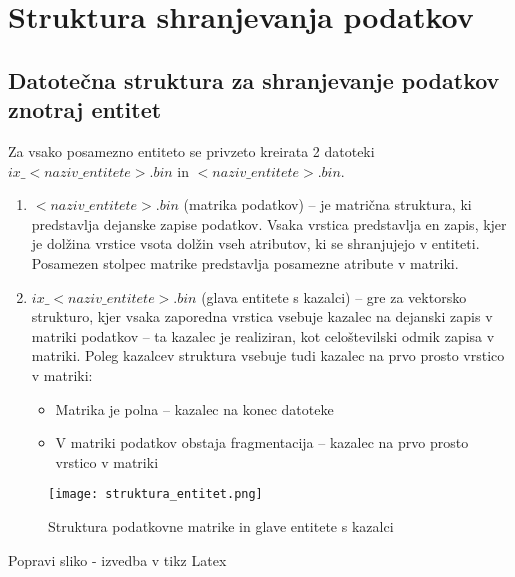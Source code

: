 \documentclass[a4paper,12pt,openright]{book}
\begin{document}
    \section{Struktura shranjevanja podatkov}
        \subsection{Datotečna struktura za shranjevanje podatkov znotraj entitet}
        Za vsako posamezno entiteto se privzeto kreirata 2 datoteki $ix\_<naziv\_entitete>.bin$ in $<naziv\_entitete>.bin$.
        \begin{enumerate}
            \item $<naziv\_entitete>.bin$ (matrika podatkov) – je matrična struktura, ki predstavlja dejanske zapise podatkov. Vsaka vrstica predstavlja en zapis, kjer je dolžina vrstice vsota dolžin vseh atributov, ki se shranjujejo v entiteti. Posamezen stolpec matrike predstavlja posamezne atribute v matriki.
            \item $ix\_<naziv\_entitete>.bin$ (glava entitete s kazalci) – gre za vektorsko strukturo, kjer vsaka zaporedna vrstica vsebuje kazalec na dejanski zapis v matriki podatkov – ta kazalec je realiziran, kot celoštevilski odmik zapisa v matriki. Poleg kazalcev struktura vsebuje tudi kazalec na prvo prosto vrstico v matriki:
            \begin{itemize}
                \item Matrika je polna – kazalec na konec datoteke
                \item V matriki podatkov obstaja fragmentacija – kazalec na prvo prosto vrstico v matriki 
            \end{itemize}
        \end{enumerate}

        \begin{figure}[h]
            \centerline{\texttt{[image: struktura\_entitet.png]}}
            \caption{Struktura podatkovne matrike in glave entitete s kazalci}
            \label{sl:mindmap}
        \end{figure}

        \colorbox{BurntOrange}{Popravi sliko - izvedba v tikz Latex}
        
        
\end{document}
